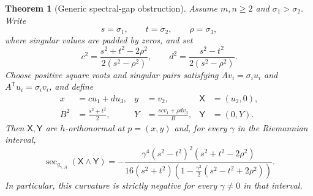 \documentclass[11pt]{amsart}
\newtheorem{theorem}{Theorem}[section]
\theoremstyle{definition}
\theoremstyle{remark}
\DeclareMathOperator{\secop}{sec}
\begin{document}
\begin{theorem}[Generic spectral-gap obstruction]
\label{thm:spectral-gap}
Assume $m,n\geq2$ and $\sigma_1>\sigma_2$.  Write
\[
 s=\sigma_1,\qquad t=\sigma_2,\qquad \rho=\sigma_3,
\]
where singular values are padded by zeros, and set
\begin{equation}\label{eq:spectral-cd}
 c^2=\frac{s^2+t^2-2\rho^2}{2(s^2-\rho^2)},
 \qquad
 d^2=\frac{s^2-t^2}{2(s^2-\rho^2)}.
\end{equation}
Choose positive square roots and singular pairs satisfying
$Av_i=\sigma_i u_i$ and $A^{\mathsf T}u_i=\sigma_i v_i$, and define
\begin{equation}\label{eq:spectral-plane}
 \begin{aligned}
  x&=cu_1+du_3,& y&=v_2,& \mathsf X&=(u_2,0),\\
  B^2&=\frac{s^2+t^2}{2},&
  Y&=\frac{scv_1+\rho d v_3}{B},&
  \mathsf Y&=(0,Y).
 \end{aligned}
\end{equation}
Then $\mathsf X,\mathsf Y$ are $h$-orthonormal at $p=(x,y)$ and,
for every $\gamma$ in the Riemannian interval,
\begin{equation}\label{eq:spectral-gap-curvature}
 \secop_{g_{\gamma,A}}(\mathsf X\wedge\mathsf Y)
 =-\frac{
  \gamma^4(s^2-t^2)^2(s^2+t^2-2\rho^2)
 }{
  16(s^2+t^2)
  \left(1-\frac{\gamma^2}{2}(s^2-t^2+2\rho^2)\right)
 }.
\end{equation}
In particular, this curvature is strictly negative for every
$\gamma\neq0$ in that interval.
\end{theorem}
\end{document}
